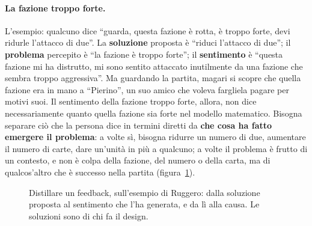 \paragraph{La fazione troppo forte.} L'esempio: qualcuno dice ``guarda, questa fazione è
rotta, è troppo forte, devi ridurle l'attacco di due''. La \textbf{soluzione} proposta è
``riduci l'attacco di due''; il \textbf{problema} percepito è ``la fazione è troppo
forte''; il \textbf{sentimento} è ``questa fazione mi ha distrutto, mi sono sentito
attaccato inutilmente da una fazione che sembra troppo aggressiva''. Ma guardando la
partita, magari si scopre che quella fazione era in mano a ``Pierino'', un suo amico che
voleva fargliela pagare per motivi suoi. Il sentimento della fazione troppo forte, allora,
non dice necessariamente quanto quella fazione sia forte nel modello matematico. Bisogna
separare ciò che la persona dice in termini diretti da \textbf{che cosa ha fatto emergere
il problema}: a volte sì, bisogna ridurre un numero di due, aumentare il numero di carte,
dare un'unità in più a qualcuno; a volte il problema è frutto di un contesto, e non è
colpa della fazione, del numero o della carta, ma di qualcos'altro che è successo nella
partita (figura~\ref{a12:fig:sentimento}).

\begin{figure}[htbp]
\centering
{}
\caption{Distillare un feedback, sull'esempio di Ruggero: dalla soluzione proposta al
sentimento che l'ha generata, e da lì alla causa. Le soluzioni sono di chi fa il
design.}
\label{a12:fig:sentimento}
\end{figure}

